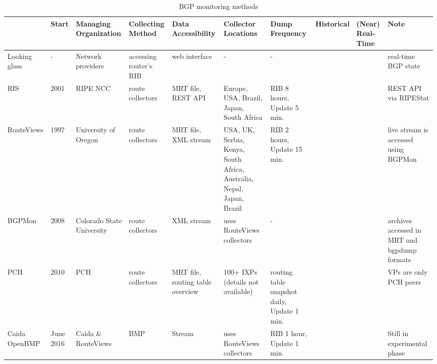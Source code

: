 

\begin{table}
	\centering
	\scriptsize
	\begin{tabular}{C{2cm} C{1cm} C{2.5cm} C{2cm} C{2.2cm} C{2.5cm} C{2.4cm} C{1cm} C{1cm} C{2cm}}
		\hline
		& \textbf{Start} & \textbf{Managing Organization} & \textbf{Collecting Method} & \textbf{Data Accessibility} & \textbf{Collector Locations} & \textbf{Dump Frequency} & \textbf{Historical} & \textbf{(Near) Real-Time} & \textbf{Note} \\
		\hline\hline
		Looking glass & - & Network providers & accessing router's RIB & web interface & - & - & \xmark & \cmark & real-time BGP state\\ \hline
		RIS \cite{ripe-ncc-ris}& 2001 & RIPE NCC & route collectors & MRT file, REST API & Europe, USA, Brazil, Japan, South Africa & RIB 8 hours, Update 5 min. &\cmark & \xmark & REST API via RIPEStat \\ 
		\hline
		RouteViews \cite{route-views} & 1997 & University of Oregon & route collectors & MRT file, XML stream & USA, UK, Serbia, Kenya, South Africa, Australia, Nepal, Japan, Brazil & RIB 2 hours, Update 15 min. &\cmark & \cmark & live stream is accessed using BGPMon \\ 
		\hline
		BGPMon \cite{bgpmon} & 2008 & Colorado State University & route collectors & XML stream & uses RouteViews collectors & - &\cmark & \cmark & archives accessed in MRT and bgpdump formats \\ 
		\hline 
		PCH \cite{pch} & 2010 & PCH & route collectors & MRT file, routing table overview & 100+ IXPs (details not available) & routing table snapshot daily, Update 1 min. &\cmark & \xmark & VPs are only PCH peers\\ 
		\hline
		Caida OpenBMP \cite{caida-bmp} & June 2016 & Caida \& RouteViews & BMP & Stream & uses RouteViews collectors  & RIB 1 hour, Update 1 min. &\cmark & \cmark & Still in experimental phase \\ 
		\hline
	\end{tabular}
	\caption{BGP monitoring methods}
	\label{table:ch02:monitoring-methods}
\end{table}

